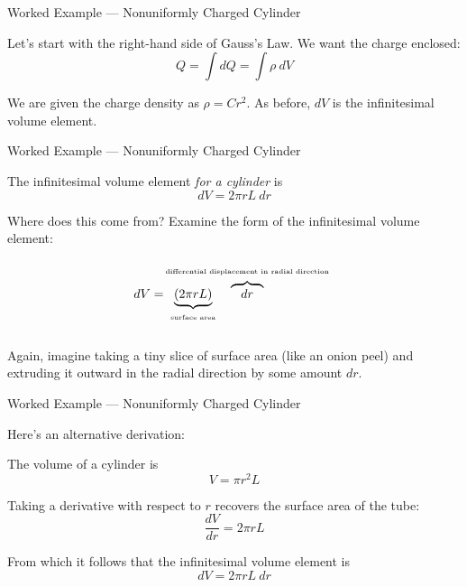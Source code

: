 \documentclass{beamer}
\begin{document}
\begin{frame}{Worked Example --- Nonuniformly Charged Cylinder}

Let's start with the right-hand side of Gauss's Law. We want the charge enclosed:
\begin{equation*}
    Q = \int dQ = \int \rho\ dV
\end{equation*}

We are given the charge density as $\rho = Cr^2$. As before, $dV$ is the infinitesimal volume element.

\end{frame}

\begin{frame}{Worked Example --- Nonuniformly Charged Cylinder}

The infinitesimal volume element \emph{for a cylinder} is
\begin{equation*}
    dV = 2\pi r L\ dr
\end{equation*}

Where does this come from? Examine the form of the infinitesimal volume element:
\begin{equation*}
    dV = \hspace{-0.02\textwidth} \underbrace{\left( 2\pi r L \right)}_{\parbox[c]{0.16\textwidth}{\tiny \vspace{-1em} \begin{center} surface area \end{center}}} \hspace{-0.16\textwidth} \overbrace{\hspace{0.8em}dr\hspace{0.8em}}^{\parbox[c]{0.4\textwidth}{\tiny \begin{center} differential displacement in radial direction \end{center}\vspace{-0.9em}}}
\end{equation*}

Again, imagine taking a tiny slice of surface area (like an onion peel) and extruding it outward in the radial direction by some amount $dr$.

\end{frame}

\begin{frame}{Worked Example --- Nonuniformly Charged Cylinder}

Here's an alternative derivation:

\vfill

The volume of a cylinder is
\begin{equation*}
    V = \pi r^2 L
\end{equation*}

Taking a derivative with respect to $r$ recovers the surface area of the tube:
\begin{equation*}
    \frac{dV}{dr} = 2\pi r L
\end{equation*}

From which it follows that the infinitesimal volume element is
\begin{equation*}
    dV = 2\pi r L\ dr
\end{equation*}

\end{frame}
\end{document}
